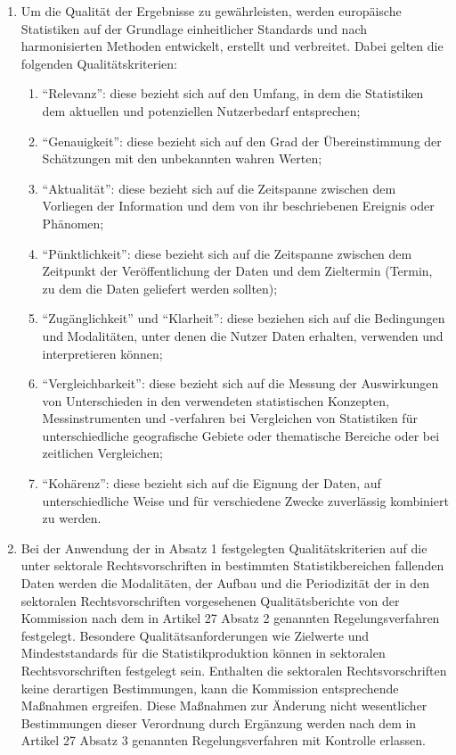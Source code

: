         \begin{enumerate}
            \item Um die Qualität der Ergebnisse zu gewährleisten, werden europäische Statistiken auf der Grundlage einheitlicher Standards und nach harmonisierten Methoden entwickelt, erstellt und verbreitet. Dabei gelten die folgenden Qualitätskriterien:
            \begin{enumerate}
                \item ``Relevanz'': diese bezieht sich auf den Umfang, in dem die Statistiken dem aktuellen und potenziellen Nutzerbedarf entsprechen;
                \item ``Genauigkeit'': diese bezieht sich auf den Grad der Übereinstimmung der Schätzungen mit den unbekannten wahren Werten;
                \item ``Aktualität'': diese bezieht sich auf die Zeitspanne zwischen dem Vorliegen der Information und dem von ihr beschriebenen Ereignis oder Phänomen;
                \item ``Pünktlichkeit'': diese bezieht sich auf die Zeitspanne zwischen dem Zeitpunkt der Veröffentlichung der Daten und dem Zieltermin (Termin, zu dem die Daten geliefert werden sollten);
                \item ``Zugänglichkeit'' und ``Klarheit'': diese beziehen sich auf die Bedingungen und Modalitäten, unter denen die Nutzer Daten erhalten, verwenden und interpretieren können;
                \item ``Vergleichbarkeit'': diese bezieht sich auf die Messung der Auswirkungen von Unterschieden in den verwendeten statistischen Konzepten, Messinstrumenten und -verfahren bei Vergleichen von Statistiken für unterschiedliche geografische Gebiete oder thematische Bereiche oder bei zeitlichen Vergleichen;
                \item ``Kohärenz'': diese bezieht sich auf die Eignung der Daten, auf unterschiedliche Weise und für verschiedene Zwecke zuverlässig kombiniert zu werden.
            \end{enumerate}
            \item Bei der Anwendung der in Absatz 1 festgelegten Qualitätskriterien auf die unter sektorale Rechtsvorschriften in bestimmten Statistikbereichen fallenden Daten werden die Modalitäten, der Aufbau und die Periodizität der in den sektoralen Rechtsvorschriften vorgesehenen Qualitätsberichte von der Kommission nach dem in Artikel 27 Absatz 2 genannten Regelungsverfahren festgelegt.
            Besondere Qualitätsanforderungen wie Zielwerte und Mindeststandards für die Statistikproduktion können in sektoralen Rechtsvorschriften festgelegt sein. Enthalten die sektoralen Rechtsvorschriften keine derartigen Bestimmungen, kann die Kommission entsprechende Maßnahmen ergreifen. Diese Maßnahmen zur Änderung nicht wesentlicher Bestimmungen dieser Verordnung durch Ergänzung werden nach dem in Artikel 27 Absatz 3 genannten Regelungsverfahren mit Kontrolle erlassen.

\end{enumerate}
